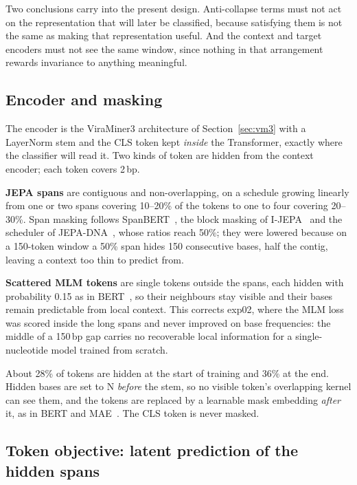 \documentclass[10pt,twocolumn,a4paper]{article}
\begin{document}
Two conclusions carry into the present design. Anti-collapse terms must not act
on the representation that will later be classified, because satisfying them is
not the same as making that representation useful. And the context and target
encoders must not see the same window, since nothing in that arrangement rewards
invariance to anything meaningful.

\subsection{Encoder and masking}

The encoder is the ViraMiner3 architecture of Section~\ref{sec:vm3} with a
LayerNorm stem and the CLS token kept \emph{inside} the Transformer, exactly
where the classifier will read it. Two kinds of token are hidden from the context
encoder; each token covers 2\,bp.

\textbf{JEPA spans} are contiguous and non-overlapping, on a schedule growing
linearly from one or two spans covering 10--20\% of the tokens to one to four
covering 20--30\%. Span masking follows SpanBERT~\cite{joshi2020spanbert}, the
block masking of I-JEPA~\cite{assran2023ijepa} and the scheduler of
JEPA-DNA~\cite{larey2026jepadna}, whose ratios reach 50\%; they were lowered
because on a 150-token window a 50\% span hides 150 consecutive bases, half the
contig, leaving a context too thin to predict from.

\textbf{Scattered MLM tokens} are single tokens outside the spans, each hidden
with probability 0.15 as in BERT~\cite{devlin2019bert}, so their neighbours stay
visible and their bases remain predictable from local context. This corrects
exp02, where the MLM loss was scored inside the long spans and never improved on
base frequencies: the middle of a 150\,bp gap carries no recoverable local
information for a single-nucleotide model trained from scratch.

About 28\% of tokens are hidden at the start of training and 36\% at the end.
Hidden bases are set to N \emph{before} the stem, so no visible token's
overlapping kernel can see them, and the tokens are replaced by a learnable mask
embedding \emph{after} it, as in BERT and MAE~\cite{he2022mae}. The CLS token is
never masked.

\subsection{Token objective: latent prediction of the hidden spans}
\end{document}

